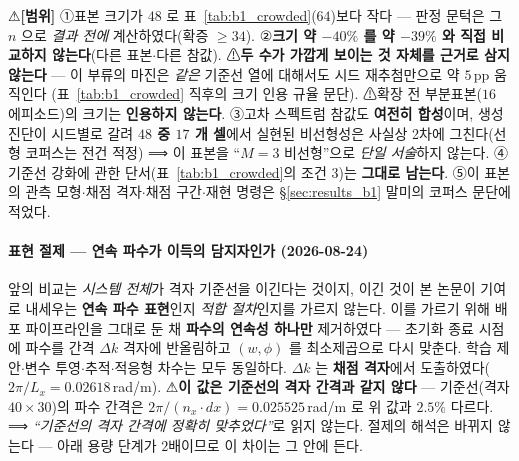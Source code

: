 \documentclass[11pt]{report}
\numberwithin{equation}{chapter}
\numberwithin{figure}{chapter}
\numberwithin{table}{chapter}
\begin{document}
⚠\textbf{[범위]} ①표본 크기가 $48$ 로 표~\ref{tab:b1_crowded}($64$)보다 작다 ---
판정 문턱은 그 $n$ 으로 \emph{결과 전에} 계산하였다(확증 $\geq 34$).
②\textbf{크기 약 $-40\%$ 를 약 $-39\%$ 와 직접 비교하지 않는다}(다른 표본$\cdot$다른 참값).
⚠\textbf{두 수가 가깝게 보이는 것 자체를 근거로 삼지 않는다} --- 이 부류의 마진은
\emph{같은} 기준선 열에 대해서도 시드 재추첨만으로 약 $5$\,pp 움직인다
(표~\ref{tab:b1_crowded} 직후의 크기 인용 규율 문단).
⚠확장 전 부분표본($16$ 에피소드)의 크기는 \textbf{인용하지 않는다}. ③고차 스펙트럼 참값도 \textbf{여전히 합성}이며,
생성 진단이 시드별로 갈려 \textbf{$48$ 중 $17$ 개 셀}에서 실현된 비선형성은 사실상 2차에
그친다(선형 코퍼스는 전건 적정) ⟹ 이 표본을 ``$M{=}3$ 비선형''으로 \emph{단일 서술}하지 않는다.
④기준선 강화에 관한 단서(표~\ref{tab:b1_crowded}의 조건 3)는 \textbf{그대로 남는다}.
⑤이 표본의 관측 모형$\cdot$채점 격자$\cdot$채점 구간$\cdot$재현 명령은
\S\ref{sec:results_b1} 말미의 코퍼스 문단에 적었다.

\paragraph{표현 절제 --- 연속 파수가 이득의 담지자인가 (2026-08-24)}
\label{sec:ablation_k}
앞의 비교는 \emph{시스템 전체}가 격자 기준선을 이긴다는 것이지, 이긴 것이 본 논문이
기여로 내세우는 \textbf{연속 파수 표현}인지 \emph{적합 절차}인지를 가르지 않는다.
이를 가르기 위해 배포 파이프라인을 그대로 둔 채 \textbf{파수의 연속성 하나만} 제거하였다 ---
초기화 종료 시점에 파수를 간격 $\Delta k$ 격자에 반올림하고 $(w,\phi)$ 를 최소제곱으로
다시 맞춘다. 학습 제안$\cdot$변수 투영$\cdot$추적$\cdot$적응형 차수는 모두 동일하다.
$\Delta k$ 는 \textbf{채점 격자}에서 도출하였다($2\pi/L_x = 0.02618$\,rad/m).
⚠\textbf{이 값은 기준선의 격자 간격과 같지 않다} --- 기준선(격자 $40\times30$)의 파수
간격은 $2\pi/(n_x \cdot dx) = 0.025525$\,rad/m 로 위 값과 $2.5\%$ 다르다.
⟹ \emph{``기준선의 격자 간격에 정확히 맞추었다''}로 읽지 않는다. 절제의 해석은 바뀌지
않는다 --- 아래 용량 단계가 $2$배이므로 이 차이는 그 안에 든다.
\end{document}
